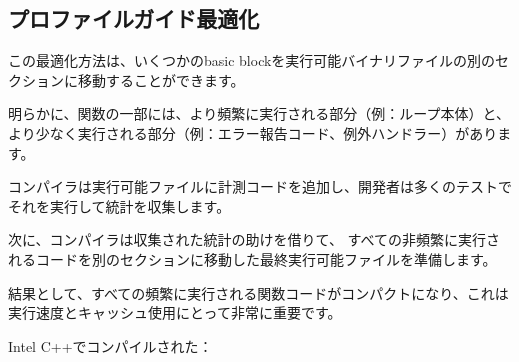 

\subsection{プロファイルガイド最適化}
\label{PGO}

\myindex{\oracle}

この最適化方法は、いくつかの\gls{basic block}を実行可能バイナリファイルの別のセクションに移動することができます。

明らかに、関数の一部には、より頻繁に実行される部分（例：ループ本体）と、
より少なく実行される部分（例：エラー報告コード、例外ハンドラー）があります。

コンパイラは実行可能ファイルに計測コードを追加し、開発者は多くのテストでそれを実行して統計を収集します。

次に、コンパイラは収集された統計の助けを借りて、
すべての非頻繁に実行されるコードを別のセクションに移動した最終実行可能ファイルを準備します。

結果として、すべての頻繁に実行される関数コードがコンパクトになり、これは実行速度とキャッシュ使用にとって非常に重要です。

Intel C++でコンパイルされた：


